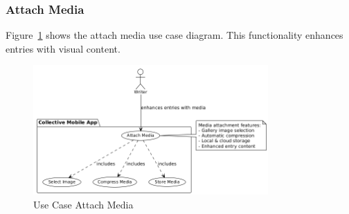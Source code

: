 \subsubsection{Attach Media}

Figure~\ref{fig:usecase-attach-media} shows the attach media use case diagram. This functionality enhances entries with visual content.

\begin{figure}[H]
\centering
\includegraphics[width=0.8\textwidth]{files/imgs/usecase_U9ojKZjhmp.png}
\caption{Use Case Attach Media}
\label{fig:usecase-attach-media}
\end{figure}

